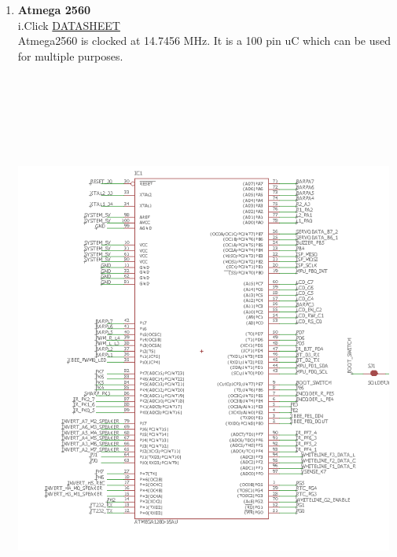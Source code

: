 \documentclass[a4paper,12pt,oneside]{book}
\begin{document}
 \begin{enumerate}
    \item \textbf{Atmega 2560}\\
    i.Click \href{http://www.atmel.com/Images/Atmel-2549-8-bit-AVR-Microcontroller-ATmega640-1280-1281-2560-2561_datasheet.pdf}{DATASHEET}
    \\[0.5cm]	Atmega2560 is clocked at 14.7456 MHz. It is a 100 pin uC which can be used for multiple purposes.
    
    \\\vspace*{1.3cm}\hspace*{-1cm}\includegraphics[width=12.5cm, height=18cm]{atmega2560}
    

\end{enumerate}
\end{document}
